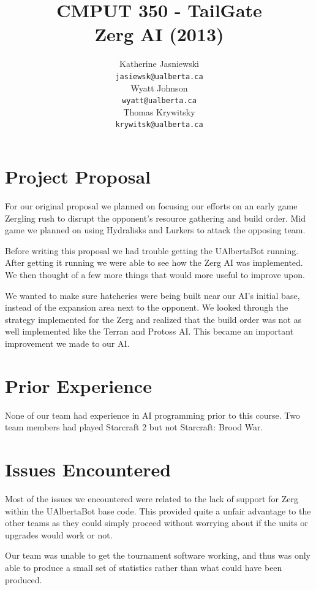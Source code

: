 \documentclass{article}
\title{CMPUT 350 - TailGate\\
Zerg AI (2013)} %
\author{
		Katherine Jasniewski\\
		\texttt{jasiewsk@ualberta.ca} \\
	\AND
		Wyatt Johnson\\
		\texttt{wyatt@ualberta.ca} \\
	\AND
		Thomas Krywitsky\\
		\texttt{krywitsk@ualberta.ca} \\
}
\begin{document}
\maketitle


\section{Project Proposal}

For our original proposal we planned on focusing our efforts on an early game Zergling rush to disrupt the opponent's resource gathering and build order. Mid game we planned on using Hydralisks and Lurkers to attack the opposing team.

Before writing this proposal we had trouble getting the UAlbertaBot running. After getting it running we were able to see how the Zerg AI was implemented. We then thought of a few more things that would more useful to improve upon.

We wanted to make sure hatcheries were being built near our AI’s initial base, instead of the expansion area next to the opponent. We looked through the strategy implemented for the Zerg and realized that the build order was not as well implemented like the Terran and Protoss AI. This became an important improvement we made to our AI.

\section{Prior Experience}

None of our team had experience in AI programming prior to this course. Two team members had played Starcraft 2 but not Starcraft: Brood War.

\section{Issues Encountered}

Most of the issues we encountered were related to the lack of support for Zerg within the UAlbertaBot base code. This provided quite a unfair advantage to the other teams as they could simply proceed without worrying about if the units or upgrades would work or not.

Our team was unable to get the tournament software working, and thus was only able to produce a small set of statistics rather than what could have been produced.
\end{document}
